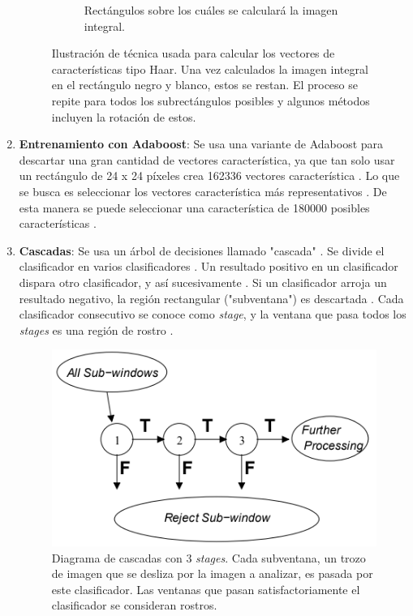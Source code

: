 \documentclass[a4paper,openright,12pt]{report}
\begin{document}
\begin{enumerate}
\begin{figure}[H]
\begin{subfigure}[b]{0.4\textwidth}
        \caption{Rectángulos sobre los cuáles se calculará la imagen integral.}
        \label{fig:haar-face-with-rectangles}
      \end{subfigure}
      \caption{Ilustración de técnica usada para calcular los vectores de
      características tipo Haar. Una vez calculados la imagen integral en el
      rectángulo negro y blanco, estos se restan. El proceso se repite para
      todos los subrectángulos posibles y algunos métodos incluyen la rotación
      de estos.}
    \end{figure}

    \item \textbf{Entrenamiento con  Adaboost}: 
    Se usa una variante de Adaboost para descartar una gran cantidad de vectores
    característica, ya que tan solo usar un rectángulo de 24 x 24 píxeles crea
    162336 vectores característica \cite{wang2014analysis}.
    Lo que se busca es seleccionar los vectores característica más
    representativos \cite{violajones}. De esta manera se puede seleccionar una
    característica de 180000 posibles características \cite{violajones}.

    \item \textbf{Cascadas}:
    Se usa un árbol de decisiones llamado "cascada" \cite{violajones}.
    Se divide el clasificador en varios clasificadores \cite{violajones}.
    Un resultado positivo en un clasificador dispara otro clasificador, y así
    sucesivamente \cite{violajones}. Si un clasificador arroja un resultado
    negativo, la región rectangular ("subventana") es descartada
    \cite{violajones}. Cada clasificador consecutivo se conoce como
    \textit{stage}, y la ventana que pasa todos los \textit{stages} es una
    región de rostro \cite{violajones}.

    \begin{figure}[H]
      \centering
        \includegraphics{../images/cascade-diagram.png}\par
      \caption{Diagrama de cascadas con 3 \textit{stages}. Cada subventana, un
      trozo de imagen que se desliza por la imagen a analizar, es pasada por
      este clasificador. Las ventanas que pasan satisfactoriamente el
      clasificador se consideran rostros.}
      \label{fig:cascades-diagram}
    \end{figure}
\end{enumerate}
\end{document}

